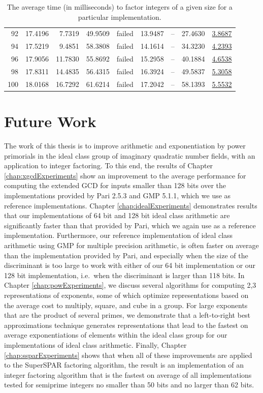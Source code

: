 \documentclass{ucalgthes1}
\theoremstyle{definition}
\newcommand{\GMP}{GMP 5.1.1}
\newcommand{\Pari}{Pari 2.5.3}
\begin{document}
\begin{table}[htb]
\begin{tabular}{| r | r | r | r | r | r | r | r | r |}
92 & 17.4196 & 7.7319 & 49.9509 & failed & 13.9487 & -- & 27.4630 & \underline{3.8687} \\
94 & 17.5219 & 9.4851 & 58.3808 & failed & 14.1614 & -- & 34.3230 & \underline{4.2393} \\
96 & 17.9056 & 11.7830 & 55.8692 & failed & 15.2958 & -- & 40.1884 & \underline{4.6538} \\
98 & 17.8311 & 14.4835 & 56.4315 & failed & 16.3924 & -- & 49.5837 & \underline{5.3058} \\
100 & 18.0168 & 16.7292 & 61.6214 & failed & 17.2042 & -- & 58.1393 & \underline{5.5532} \\
	\hline
\end{tabular}
\caption[Average time to factor]{The average time (in milliseconds) to factor integers of a given size for a particular implementation.}
\label{tab:factoringTimes}
\end{table}

\clearpage

\chapter{Future Work}

The work of this thesis is to improve arithmetic and exponentiation by power primorials in the ideal class group of imaginary quadratic number fields, with an application to integer factoring.  To this end, the results of Chapter \ref{chap:xgcdExperiments} show an improvement to the average performance for computing the extended GCD for inputs smaller than 128 bits over the implementations provided by \Pari{} \cite{PariGP} and \GMP \cite{Gmp}, which we use as reference implementations.  Chapter \ref{chap:idealExperiments} demonstrates results that our implementations of 64 bit and 128 bit ideal class arithmetic are significantly faster than that provided by Pari, which we again use as a reference implementation.  Furthermore, our reference implementation of ideal class arithmetic using GMP for multiple precision arithmetic, is often faster on average than the implementation provided by Pari, and especially when the size of the discriminant is too large to work with either of our 64 bit implementation or our 128 bit implementation, i.e.\ when the discriminant is larger than 118 bits.  In Chapter \ref{chap:powExperiments}, we discuss several algorithms for computing 2,3 representations of exponents, some of which optimize representations based on the average cost to multiply, square, and cube in a group.  For large exponents that are the product of several primes, we demonstrate that a left-to-right best approximations technique generates representations that lead to the fastest on average exponentiations of elements within the ideal class group for our implementations of ideal class arithmetic.  Finally, Chapter \ref{chap:ssparExperiments} shows that when all of these improvements are applied to the SuperSPAR factoring algorithm, the result is an implementation of an integer factoring algorithm that is the fastest on average of all implementations tested for semiprime integers no smaller than 50 bits and no larger than 62 bits.
\end{document}
